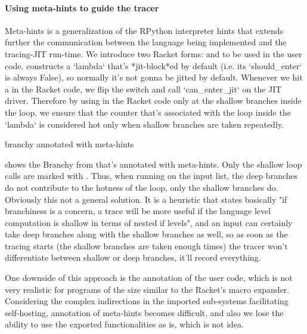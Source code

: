     \begin{paragraph-here}%
      \paragraph{Using meta-hints to guide the tracer} Meta-hints is a generalization of the RPython interpreter hints that extends further the communication between the language being implemented and the tracing-JIT run-time. We introduce two Racket forms:  and  to be used in the user code.  constructs a `lambda` that's *jit-block*ed by default (i.e. its `should\_enter` is always False), so normally it's not gonna be jitted by default. Whenever we hit a  in the Racket code, we flip the switch and call `can\_enter\_jit` on the JIT driver. Therefore by using  in the Racket code only at the shallow branches inside the loop, we ensure that the counter that's associated with the loop inside the `lambda` is considered hot only when shallow branches are taken repeatedly.
    \end{paragraph-here}

    \begin{figure-here}
      branchy annotated with meta-hints
    \end{figure-here}

    \begin{paragraph-here}%
      \figref{} shows the Branchy from  that's annotated with meta-hints. Only the shallow loop calls are marked with . Thus, when running on the input list, the deep branches do not contribute to the hotness of the loop, only the shallow branches do. Obviously this not a general solution. It is a heuristic that states basically "if branchiness is a concern, a trace will be more useful if the language level computation is shallow in terms of nested if levels", and an input can certainly take deep branches along with the shallow branches as well, so as soon as the tracing starts (the shallow branches are taken enough times) the tracer won't differentiate between shallow or deep branches, it'll record everything.
    \end{paragraph-here}

    \begin{paragraph-here}%
      One downside of this approach is the annotation of the user code, which is not very realistic for programs of the size similar to the Racket's macro expander. Considering the complex indirections in the imported sub-systems facilitating self-hosting, annotation of meta-hints becomes difficult, and also we lose the ability to use the exported functionalities as is, which is not idea.
    \end{paragraph-here}


